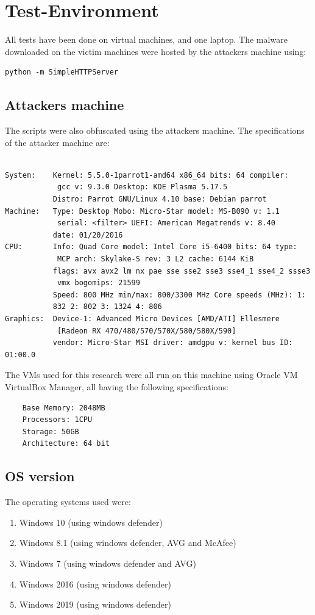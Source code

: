 \documentclass{article}%
\begin{document}
\section{Test-Environment}
All tests have been done on virtual machines, and one laptop. The malware downloaded on the victim machines were hosted by the attackers machine using:
\begin{verbatim}
python -m SimpleHTTPServer
\end{verbatim}
\subsection{Attackers machine}
The scripts were also obfuscated using the attackers machine. The specifications of the attacker machine are:\\
\\
\begin{verbatim}
System:    Kernel: 5.5.0-1parrot1-amd64 x86_64 bits: 64 compiler:
			gcc v: 9.3.0 Desktop: KDE Plasma 5.17.5 
           Distro: Parrot GNU/Linux 4.10 base: Debian parrot
Machine:   Type: Desktop Mobo: Micro-Star model: MS-B090 v: 1.1 
			serial: <filter> UEFI: American Megatrends v: 8.40 
           date: 01/20/2016 
CPU:       Info: Quad Core model: Intel Core i5-6400 bits: 64 type:
			MCP arch: Skylake-S rev: 3 L2 cache: 6144 KiB 
           flags: avx avx2 lm nx pae sse sse2 sse3 sse4_1 sse4_2 ssse3
            vmx bogomips: 21599 
           Speed: 800 MHz min/max: 800/3300 MHz Core speeds (MHz): 1: 
           832 2: 802 3: 1324 4: 806 
Graphics:  Device-1: Advanced Micro Devices [AMD/ATI] Ellesmere 
			[Radeon RX 470/480/570/570X/580/580X/590] 
           vendor: Micro-Star MSI driver: amdgpu v: kernel bus ID: 01:00.0
\end{verbatim}
The VMs used for this research were all run on this machine using Oracle VM VirtualBox Manager, all having the following specifications:
\begin{verbatim}
	Base Memory: 2048MB
	Processors: 1CPU
	Storage: 50GB
	Architecture: 64 bit
\end{verbatim}
\subsection{OS version}
The operating systems used were:
\begin{enumerate}
	\item Windows 10 (using windows defender)
	\item Windows 8.1 (using windows defender, AVG and McAfee)
	\item Windows 7 (using windows defender and AVG)
	\item Windows 2016 (using windows defender)
	\item Windows 2019 (using windows defender)
\end{enumerate}
\end{document}
